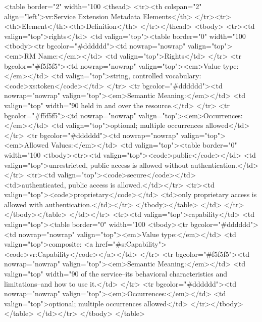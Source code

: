 \documentclass[11pt,a4paper]{ivoa}
\begin{document}
<table border="2" width="100%
<thead>
  <tr><th colspan="2" align="left">vr:Service Extension Metadata Elements</th>
  </tr><tr><th>Element</th><th>Definition</th>
</tr></thead>
<tbody>
  <tr><td valign="top">rights</td>
      <td valign="top"><table border="0" width="100%
          <tbody><tr bgcolor="#dddddd"><td nowrap="nowrap" valign="top"><em>RM Name:</em></td>
              <td valign="top">Rights</td>
          </tr>
          <tr bgcolor="#f5f5f5"><td nowrap="nowrap" valign="top"><em>Value type:</em></td>
              <td valign="top">string, controlled vocabulary:
                               <code>xs:token</code></td>
          </tr>
          <tr bgcolor="#dddddd"><td nowrap="nowrap" valign="top"><em>Semantic Meaning:</em></td>
              <td valign="top" width="90%
held in and over the resource.</td>  
          </tr>
          <tr bgcolor="#f5f5f5"><td nowrap="nowrap" valign="top"><em>Occurrences:</em></td>
              <td valign="top">optional; multiple occurrences allowed</td>
          </tr>
          <tr bgcolor="#dddddd"><td nowrap="nowrap" valign="top"><em>Allowed Values:</em></td>
              <td valign="top"><table border="0" width="100%
                 <tbody><tr><td valign="top"><code>public</code></td>
                     <td valign="top">unrestricted, public access is
                         allowed without authentication.</td></tr>
                 <tr><td valign="top"><code>secure</code></td>
                     <td>authenticated, public access is allowed.</td></tr>
                 <tr><td valign="top"><code>proprietary</code></td>
                     <td>only proprietary access is allowed with
                         authentication.</td></tr>  
              </tbody></table>
              </td> 
          </tr></tbody></table>
      </td></tr>
  <tr><td valign="top">capability</td>
      <td valign="top"><table border="0" width="100%
          <tbody><tr bgcolor="#dddddd"><td nowrap="nowrap" valign="top"><em>Value type:</em></td>
              <td valign="top">composite: <a href="#s:Capability"><code>vr:Capability</code></a></td>
          </tr>
          <tr bgcolor="#f5f5f5"><td nowrap="nowrap" valign="top"><em>Semantic Meaning:</em></td>
              <td valign="top" width="90%
                  of the service--its behavioral characteristics and
                  limitations--and how to use it.</td>  
          </tr>
          <tr bgcolor="#dddddd"><td nowrap="nowrap" valign="top"><em>Occurrences:</em></td>
              <td valign="top">optional; multiple occurrences allowed</td>
          </tr></tbody></table>
      </td></tr>
</tbody>
</table>
\end{document}

